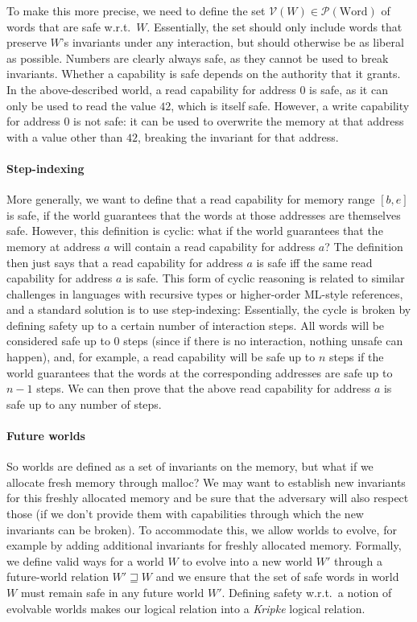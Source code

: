 \documentclass[acmsmall,review]{acmart}\settopmatter{printfolios=true}
\newcommand{\powerset}[1]{\mathcal{P}(#1)}
\newcommand{\future}{\mathbin{\sqsupseteq}}
\newcommand{\asmType}{\plaindom{AsmType}}
\newcommand{\plaindom}[1]{\mathrm{#1}}
\newcommand{\Words}{\plaindom{Word}}
\newcommand{\intr}[2]{\mathcal{#1}}
\newcommand{\valueintr}[1]{\intr{V}{#1}}
\newcommand{\stdvr}{\valueintr{\asmType}}
\begin{document}
To make this more precise, we need to define the set $\stdvr(W) \in
\powerset{\Words}$ of words that are safe w.r.t.\ $W$. Essentially, the set
should only include words that preserve $W$'s invariants under any interaction,
but should otherwise be as liberal as possible. Numbers are clearly always safe,
as they cannot be used to break invariants. Whether a capability is safe depends
on the authority that it grants. In the above-described world, a read capability
for address $0$ is safe, as it can only be used to read the value $42$, which is
itself safe. However, a write capability for address $0$ is not safe: it can be
used to overwrite the memory at that address with a value other than $42$,
breaking the invariant for that address.

\paragraph{Step-indexing}
More generally, we want to define that a read capability for memory range
$[b,e]$ is safe, if the world guarantees that the words at those addresses are
themselves safe. However, this definition is cyclic: what if the world
guarantees that the memory at address $a$ will contain a read capability for
address $a$? The definition then just says that a read capability for address
$a$ is safe iff the same read capability for address $a$ is safe. This form of
cyclic reasoning is related to similar challenges in languages with recursive
types or higher-order ML-style references, and a standard solution is
to use step-indexing: Essentially, the cycle is broken by defining safety up to a
certain number of interaction steps. All words will be considered
safe up to $0$ steps (since if there is no interaction, nothing unsafe
can happen), and, for example, a read capability will be safe up to $n$
steps if the world guarantees that the words at the corresponding addresses are
safe up to $n - 1$ steps. We can then prove that the above read capability for
address $a$ is safe up to any number of steps.

\paragraph{Future worlds}
So worlds are defined as a set of invariants on the memory, but what if we
allocate fresh memory through malloc? We may want to establish new invariants
for this freshly allocated memory and be sure that the adversary will also
respect those (if we don't provide them with capabilities through which the new
invariants can be broken). To accommodate this, we allow worlds to evolve, for
example by adding additional invariants for freshly allocated memory. Formally,
we define valid ways for a world $W$ to evolve into a new world $W'$ through a
future-world relation $W' \future W$ and we ensure that the set of safe words in
world $W$ must remain safe in any future world $W'$. Defining safety w.r.t.\ a
notion of evolvable worlds makes our logical relation into a \emph{Kripke}
logical relation.
\end{document}
